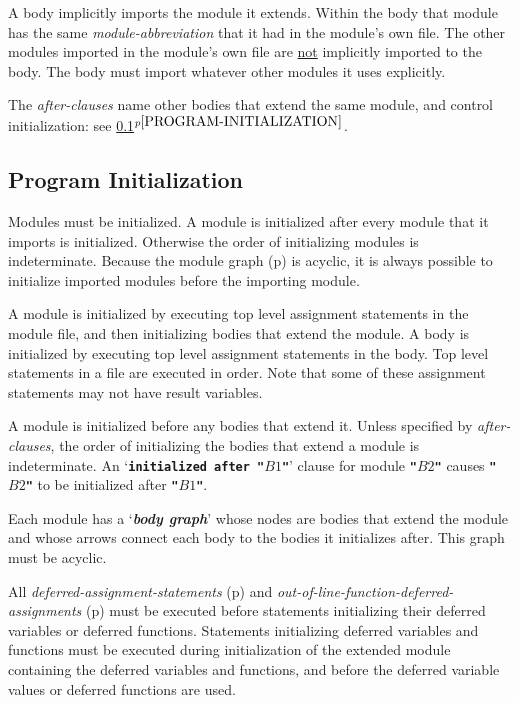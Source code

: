 \documentclass[12pt]{article}
\newcommand{\TT}[1]{{\tt \bfseries #1}}
\newcommand{\key}[1]{{\bf \em #1}\index{#1}}
\newcommand{\itemref}[1]{\ref{#1}$^{p\pageref{#1}}$}
\newcommand{\pagref}[1]{p\pageref{#1}}
\begin{document}
A body implicitly imports the module it extends.  Within the
body that module has the same {\em module-abbreviation} that it
had in the module's own file.  The other modules imported in the
module's own file are \underline{not} implicitly imported
to the body.  The body must import whatever other modules it uses
explicitly.

The {\em after-clauses} name other bodies that extend the same
module, and control initialization: see \itemref{PROGRAM-INITIALIZATION}.

\subsection{Program Initialization}
\label{PROGRAM-INITIALIZATION}

Modules must be initialized.  A module is initialized after every
module that it imports is initialized.  Otherwise the order of
initializing modules is indeterminate.  Because the module graph
(\pagref{MODULE-GRAPH}) is acyclic, it is always possible to
initialize imported modules before the importing module.

A module is initialized by executing top level assignment statements
in the module file, and then initializing
bodies that extend the module.  A body is initialized
by executing top level assignment statements in the body.
Top level statements in a file are executed in order.
Note that some of these assignment statements may not have
result variables.

A module is initialized before any bodies that extend it.
Unless specified by {\em after-clauses}, the order of initializing the
bodies that extend a module is indeterminate.
An `\TT{initialized after "$B1$"}' clause for module \TT{"$B2$"} causes
\TT{"$B2$"} to be initialized after \TT{"$B1$"}.

Each module has a `\key{body graph}'\label{BODY-GRAPH}
whose nodes are bodies that extend
the module and whose arrows connect each body to the bodies it
initializes after.  This graph must be acyclic.

All {\em deferred-assignment-statements}
(\pagref{DEFERRED-ASSIGNMENT-STATEMENTS})
and {\em out-of-line-function-deferred-assignments}
(\pagref{OUT-OF-LINE-FUNCTION-DEFERRED-ASSIGNMENT}) must be executed
before statements initializing their deferred variables or deferred functions.
Statements initializing deferred variables and functions must be executed
during initialization of the extended module containing the
deferred variables and functions, and
before the deferred variable values or deferred functions are used.
\end{document}
